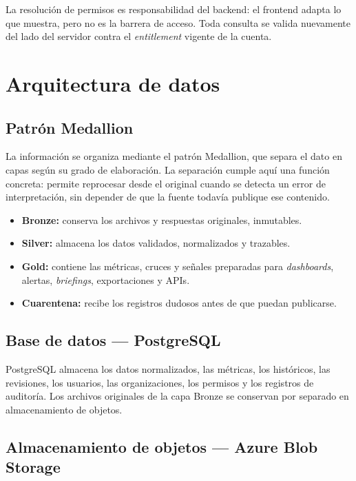 \documentclass[11pt,a4paper]{article}
\begin{document}
La resoluci\'on de permisos es responsabilidad del backend: el frontend adapta
lo que muestra, pero no es la barrera de acceso. Toda consulta se valida
nuevamente del lado del servidor contra el \emph{entitlement} vigente de la
cuenta.

\section{Arquitectura de datos}
\label{sec:datos}

\subsection{Patr\'on Medallion}

La informaci\'on se organiza mediante el patr\'on Medallion, que separa el
dato en capas seg\'un su grado de elaboraci\'on. La separaci\'on cumple aqu\'i
una funci\'on concreta: permite reprocesar desde el original cuando se detecta
un error de interpretaci\'on, sin depender de que la fuente todav\'ia publique
ese contenido.

\begin{itemize}
  \item \textbf{Bronze:} conserva los archivos y respuestas originales, inmutables.
  \item \textbf{Silver:} almacena los datos validados, normalizados y trazables.
  \item \textbf{Gold:} contiene las m\'etricas, cruces y se\~nales preparadas para
        \emph{dashboards}, alertas, \emph{briefings}, exportaciones y APIs.
  \item \textbf{Cuarentena:} recibe los registros dudosos antes de que puedan
        publicarse.
\end{itemize}

\subsection{Base de datos --- PostgreSQL}

PostgreSQL almacena los datos normalizados, las m\'etricas, los hist\'oricos, las
revisiones, los usuarios, las organizaciones, los permisos y los registros de
auditor\'ia. Los archivos originales de la capa Bronze se conservan por separado
en almacenamiento de objetos.

\subsection{Almacenamiento de objetos --- Azure Blob Storage}
\end{document}

